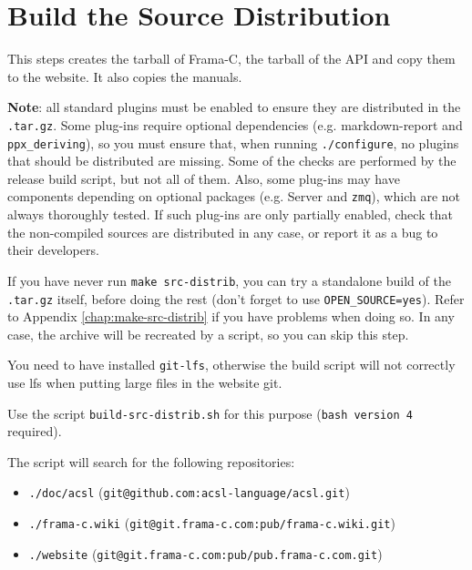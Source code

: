 
\section{Build the Source Distribution}
\label{sec:build-source-distr}

This steps creates the tarball of Frama-C, the tarball of the API and
copy them to the website. It also copies the manuals.

\textbf{Note}: all standard plugins must be enabled to ensure they are distributed
in the \verb+.tar.gz+. Some plug-ins require optional dependencies
(e.g. markdown-report and \verb+ppx_deriving+), so you must ensure that,
when running \verb+./configure+, no plugins that should be distributed are missing.
Some of the checks are performed by the release build script, but not all of them.
Also, some plug-ins may have components depending on optional packages
(e.g. Server and \verb+zmq+), which are not always thoroughly tested. If such
plug-ins are only partially enabled, check that the non-compiled sources are
distributed in any case, or report it as a bug to their developers.

If you have never run \verb+make src-distrib+, you can try a standalone build
of the \verb+.tar.gz+ itself, before doing the rest (don't forget to use
\verb+OPEN_SOURCE=yes+).
Refer to Appendix \ref{chap:make-src-distrib} if you have problems when
doing so. In any case, the archive will be recreated by a script, so you can
skip this step.

You need to have installed \texttt{git-lfs}, otherwise the build
script will not correctly use lfs when putting large files in the
website git.

 Use the script
\texttt{build-src-distrib.sh} for this purpose (\texttt{bash version
  4} required).

The script will search for the following repositories:

\begin{itemize}
  \item \texttt{./doc/acsl} (\texttt{git@github.com:acsl-language/acsl.git})
  \item \texttt{./frama-c.wiki} (\texttt{git@git.frama-c.com:pub/frama-c.wiki.git})
  \item \texttt{./website} (\texttt{git@git.frama-c.com:pub/pub.frama-c.com.git})
\end{itemize}


